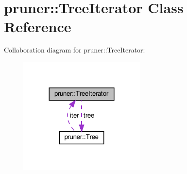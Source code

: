 \hypertarget{classpruner_1_1TreeIterator}{}\section{pruner\+:\+:Tree\+Iterator Class Reference}
\label{classpruner_1_1TreeIterator}


Collaboration diagram for pruner\+:\+:Tree\+Iterator\+:
\nopagebreak
\begin{figure}[H]
\begin{center}
\leavevmode
\includegraphics[width=180pt]{classpruner_1_1TreeIterator__coll__graph}
\end{center}
\end{figure}
